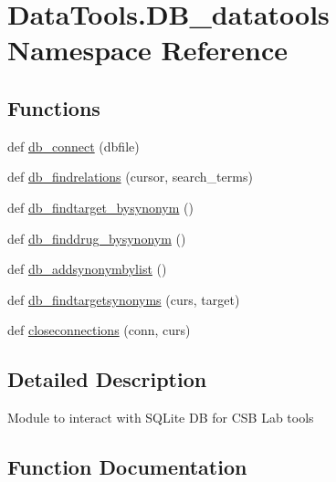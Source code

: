 \hypertarget{namespace_data_tools_1_1_d_b__datatools}{}\section{Data\+Tools.\+D\+B\+\_\+datatools Namespace Reference}
\label{namespace_data_tools_1_1_d_b__datatools}
\subsection*{Functions}
\begin{DoxyCompactItemize}
\item 
def \mbox{\hyperlink{namespace_data_tools_1_1_d_b__datatools_a439f619ddb9436e2d169bc1ffdd44f53}{db\+\_\+connect}} (dbfile)
\item 
def \mbox{\hyperlink{namespace_data_tools_1_1_d_b__datatools_a2a67b578f5ff9551e8dff60801003d03}{db\+\_\+findrelations}} (cursor, search\+\_\+terms)
\item 
def \mbox{\hyperlink{namespace_data_tools_1_1_d_b__datatools_a7037f72ba89fb8116266f6da2035ef5a}{db\+\_\+findtarget\+\_\+bysynonym}} ()
\item 
def \mbox{\hyperlink{namespace_data_tools_1_1_d_b__datatools_ac08628067d00d384a652ff7667824d8f}{db\+\_\+finddrug\+\_\+bysynonym}} ()
\item 
def \mbox{\hyperlink{namespace_data_tools_1_1_d_b__datatools_a1212712fcf953f4da8f4f9305eb4f1a7}{db\+\_\+addsynonymbylist}} ()
\item 
def \mbox{\hyperlink{namespace_data_tools_1_1_d_b__datatools_adace12ff97f1c03f8beac9f2c3853972}{db\+\_\+findtargetsynonyms}} (curs, target)
\item 
def \mbox{\hyperlink{namespace_data_tools_1_1_d_b__datatools_abd91ba3400217a142f9142503972316a}{closeconnections}} (conn, curs)
\end{DoxyCompactItemize}


\subsection{Detailed Description}
\begin{DoxyVerb}Module to interact with SQLite DB for CSB Lab tools
\end{DoxyVerb}
 

\subsection{Function Documentation}
\mbox{\label{namespace_data_tools_1_1_d_b__datatools_abd91ba3400217a142f9142503972316a}} 

